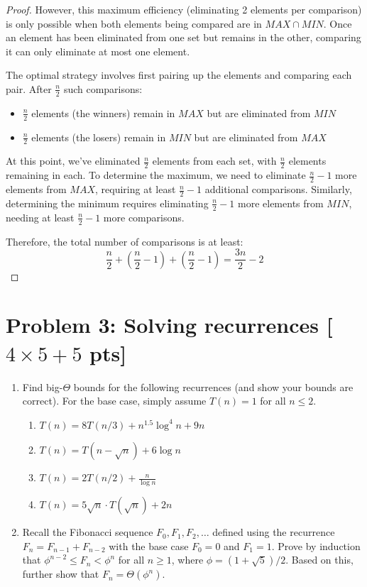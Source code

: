 \documentclass[letterpaper, 11pt]{article}
\newcommand{\1}{\mathds{1}}	%
\theoremstyle{definition}
\newcommand{\problem}[1]{\section*{Problem #1}}
\newenvironment{solution}{{\par\noindent\it Solution.}}{}
\begin{document}
\begin{solution}
\begin{proof}
However, this maximum efficiency (eliminating 2 elements per comparison) is only possible when both elements being compared are in $MAX \cap MIN$. Once an element has been eliminated from one set but remains in the other, comparing it can only eliminate at most one element.

The optimal strategy involves first pairing up the elements and comparing each pair. After $\frac{n}{2}$ such comparisons:
\begin{itemize}
    \item $\frac{n}{2}$ elements (the winners) remain in $MAX$ but are eliminated from $MIN$
    \item $\frac{n}{2}$ elements (the losers) remain in $MIN$ but are eliminated from $MAX$
\end{itemize}

At this point, we've eliminated $\frac{n}{2}$ elements from each set, with $\frac{n}{2}$ elements remaining in each. To determine the maximum, we need to eliminate $\frac{n}{2}-1$ more elements from $MAX$, requiring at least $\frac{n}{2}-1$ additional comparisons. Similarly, determining the minimum requires eliminating $\frac{n}{2}-1$ more elements from $MIN$, needing at least $\frac{n}{2}-1$ more comparisons.

Therefore, the total number of comparisons is at least:
$$\frac{n}{2} + \left(\frac{n}{2}-1\right) + \left(\frac{n}{2}-1\right) = \frac{3n}{2} - 2$$
                \end{proof}
\end{solution}

\problem{3: Solving recurrences [$4 \times 5+5$ pts]}
\begin{enumerate}
    \item Find big-$\Theta$ bounds for the following recurrences (and show your bounds are correct). For the base case, simply assume $T(n) = 1$ for all $n \leq 2$.
    \begin{enumerate}
        \item $T(n)=8T(n/3)+n^{1.5} \log^4 n + 9n$
        \item $T(n)=T(n-\sqrt{n}) + 6 \log n$
        \item $T(n)=2T(n/2)+ \frac{n}{\log n}$
        \item $T(n)= 5\sqrt{n} \cdot T(\sqrt{n}) + 2n$
    \end{enumerate}
    \item Recall the Fibonacci sequence $F_0,F_1,F_2,\dots$ defined using the recurrence $F_n = F_{n-1}+F_{n-2}$ with the base case $F_0 = 0$ and $F_1 = 1$. Prove by induction that $\phi^{n-2} \leq F_n < \phi^n$ for all $n \geq 1$, where $\phi = (1+\sqrt{5})/2$.
    Based on this, further show that $F_n = \Theta(\phi^n)$.
\end{enumerate}
\end{document}
